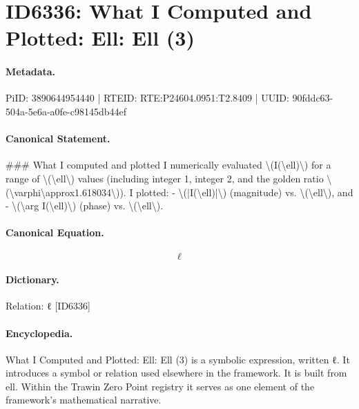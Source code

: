 \section*{ID6336: What I Computed and Plotted: Ell: Ell (3)}
\paragraph{Metadata.}
PiID: 3890644954440 | RTEID: RTE:P24604.0951:T2.8409 | UUID: 90fddc63-504a-5e6a-a0fe-c98145db44ef

\paragraph{Canonical Statement.}
\#\#\# What I computed and plotted I numerically evaluated \textbackslash{}(I(\textbackslash{}ell)\textbackslash{}) for a range of \textbackslash{}(\textbackslash{}ell\textbackslash{}) values (including integer 1, integer 2, and the golden ratio \textbackslash{}(\textbackslash{}varphi\textbackslash{}approx1.618034\textbackslash{})). I plotted: - \textbackslash{}(|I(\textbackslash{}ell)|\textbackslash{}) (magnitude) vs. \textbackslash{}(\textbackslash{}ell\textbackslash{}), and - \textbackslash{}(\textbackslash{}arg I(\textbackslash{}ell)\textbackslash{}) (phase) vs. \textbackslash{}(\textbackslash{}ell\textbackslash{}).

\paragraph{Canonical Equation.}
\[
\ell
\]

\paragraph{Dictionary.}
Relation: ℓ [ID6336]

\paragraph{Encyclopedia.}
What I Computed and Plotted: Ell: Ell (3) is a symbolic expression, written ℓ. It introduces a symbol or relation used elsewhere in the framework. It is built from ell. Within the Trawin Zero Point registry it serves as one element of the framework's mathematical narrative.
